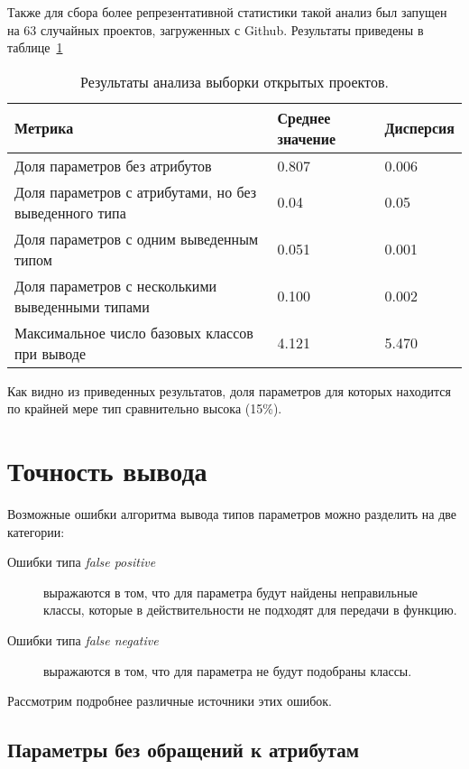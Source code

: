 Также для сбора более репрезентативной статистики такой анализ был запущен на 63
случайных проектов, загруженных с Github. Результаты приведены в
таблице~\ref{tab:statistics-results-2}

\begin{table}[H]
  \scriptsize
  \caption{Результаты анализа выборки открытых проектов.}
  \label{tab:statistics-results-2}
  \begin{tabularx}{\textwidth}{ |X|X|X| }
    \hline
    Метрика & Среднее значение & Дисперсия \\ \hline
    Доля параметров без атрибутов & 0.807 & 0.006 \\ \hline
    Доля параметров с атрибутами, но без выведенного типа & 0.04 & 0.05 \\ \hline
    Доля параметров с одним выведенным типом & 0.051 & 0.001 \\ \hline
    Доля параметров с несколькими выведенными типами & 0.100 & 0.002 \\ \hline
    Максимальное число базовых классов при выводе & 4.121 & 5.470 \\ \hline
  \end{tabularx}
\end{table}

Как видно из приведенных результатов, доля параметров для которых находится по крайней
мере тип сравнительно высока (15\%).

\section{Точность вывода}
\label{sec:inference-precision}

Возможные ошибки алгоритма вывода типов параметров можно разделить на две категории:
\begin{description}
    \item[Ошибки типа \emph{false positive}] выражаются в том, что для параметра
      будут найдены неправильные классы, которые в
      действительности не подходят для передачи в функцию.    

    \item[Ошибки типа \emph{false negative}] выражаются в том, что для параметра
      не будут подобраны классы.

\end{description}

Рассмотрим подробнее различные источники этих ошибок.

\subsection{Параметры без обращений к атрибутам}
\label{sub:attributeless-parameters}

